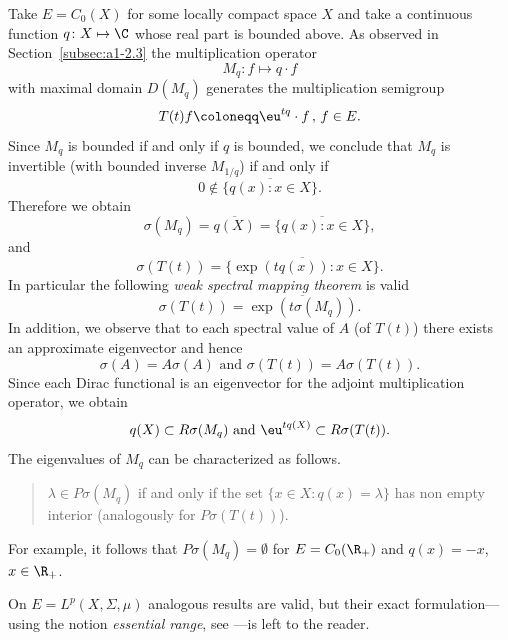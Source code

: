 \begin{example}\label{ex:a3-2.3}%
Take $E = C_{0}(X)$ for some locally compact space $X$ and take a continuous function $q \colon X \mapsto \C$ whose real part is bounded above.
As observed in Section~\ref{subsec:a1-2.3} the multiplication operator
\[
M_{q} \colon f \mapsto q \cdot f
\]
with maximal domain $D(M_{q})$ generates the multiplication semigroup
\[
T(t)f \coloneqq \eu^{tq} \cdot f \, , \, f \in E .
\]
Since $M_{q}$ is bounded if and only if\/ $q$ is bounded, we conclude that $M_{q}$ is invertible (with bounded inverse $M_{1/q}$) if and only if
\[
0 \notin \overline{\{q(x)  \colon x \in X\}} .
\]
Therefore we obtain
\[
\sigma(M_{q}) = \overline{q(X)} = \overline{\{q(x) \colon x \in X\}} ,
\]
and
\[
\sigma(T(t)) = \overline{\{\exp(tq(x)) \colon x \in X\}} .
\]
In particular the following \emph{weak spectral mapping theorem}
is valid
\[
\sigma(T(t)) = \overline{\exp(t\sigma(M_{q}))} .
\]
In addition, we observe that to each spectral value of\/ $A$ (\resp of\/ $T(t)$) there exists an approximate eigenvector and hence
\[
\sigma(A) = A\sigma(A) \text{ and } \sigma(T(t)) = A\sigma(T(t)) .
\]
Since each Dirac functional is an eigenvector for the adjoint multiplication operator, we obtain
\[
q(X) \subset R\sigma(M_{q}) \text{ and } \eu^{tq(X)} \subset R\sigma(T(t)) .
\]
The eigenvalues of\/ $M_{q}$ can be characterized as follows.
\begin{quote}
$\lambda \in P\sigma(M_{q})$ if and only if the set $\{x \in X \colon q(x) = \lambda\}$ has non empty interior (analogously for $P\sigma(T(t))$).
\end{quote}
For example, it follows that $P\sigma(M_{q}) = \emptyset$ for $E = C_{0}(\R_{+})$ and $q(x) = -x$, $x \in \R_{+}$.

On $E = L^{p}(X,\Sigma,\mu)$ analogous results are valid, but their exact formulation---using the notion \emph{essential range}, see \textcite{goldstein:1985a}---is left to the reader.
\end{example}
